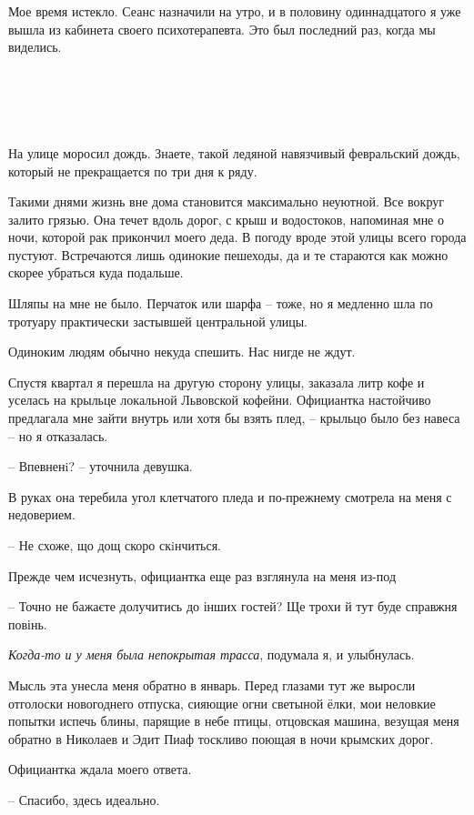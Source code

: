 \documentclass[
]{book}
\begin{document}
Мое время истекло. Сеанс назначили на утро, и в половину одиннадцатого я уже вышла из кабинета своего психотерапевта. Это был последний раз, когда мы виделись.

\hypertarget{chapter-90}{%
\chapter{~}\label{chapter-90}}

На улице моросил дождь. Знаете, такой ледяной навязчивый февральский дождь, который не прекращается по три дня к ряду.

Такими днями жизнь вне дома становится максимально неуютной. Все вокруг залито грязью. Она течет вдоль дорог, с крыш и водостоков, напоминая мне о ночи, которой рак прикончил моего деда. В погоду вроде этой улицы всего города пустуют. Встречаются лишь одинокие пешеходы, да и те стараются как можно скорее убраться куда подальше.

Шляпы на мне не было. Перчаток или шарфа -- тоже, но я медленно шла по тротуару практически застывшей центральной улицы.

Одиноким людям обычно некуда спешить. Нас нигде не ждут.

Спустя квартал я перешла на другую сторону улицы, заказала литр кофе и уселась на крыльце локальной Львовской кофейни. Официантка настойчиво предлагала мне зайти внутрь или хотя бы взять плед, -- крыльцо было без навеса -- но я отказалась.

-- Впевненi? -- уточнила девушка.

В руках она теребила угол клетчатого пледа и по-прежнему смотрела на меня с недоверием.

-- Не схоже, що дощ скоро скiнчиться.

Прежде чем исчезнуть, официантка еще раз взглянула на меня из-под

-- Точно не бажаєте долучитись до інших гостей? Ще трохи й тут буде справжня повінь.

\emph{Когда-то и у меня была непокрытая трасса}, подумала я, и улыбнулась.

Мысль эта унесла меня обратно в январь. Перед глазами тут же выросли отголоски новогоднего отпуска, сияющие огни светыной ёлки, мои неловкие попытки испечь блины, парящие в небе птицы, отцовская машина, везущая меня обратно в Николаев и Эдит Пиаф тоскливо поющая в ночи крымских дорог.

Официантка ждала моего ответа.

-- Спасибо, здесь идеально.
\end{document}
